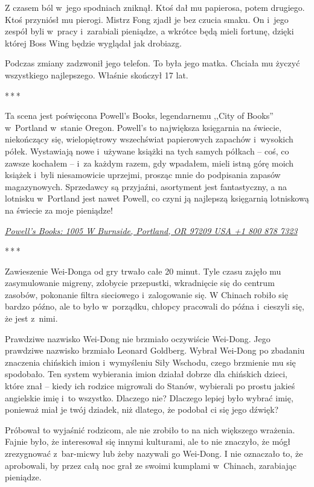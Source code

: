 \documentclass[oneside,polish,11pt,rmheadings]{mwbk}
\newcommand{\threeast}{\par\centerline{*\,*\,*}\medskip\par}
\begin{document}
Z czasem ból w~jego spodniach zniknął. Ktoś dał mu papierosa, potem drugiego. Ktoś przyniósł mu pierogi. Mistrz Fong zjadł je bez czucia smaku. On i~jego zespół byli w~pracy i~zarabiali pieniądze, a wkrótce będą mieli fortunę, dzięki której Boss Wing będzie wyglądał jak drobiazg. 


Podczas zmiany zadzwonił jego telefon. To była jego matka. Chciała mu życzyć wszystkiego najlepszego. Właśnie skończył 17 lat. 


\bigskip
\threeast


Ta scena jest poświęcona Powell's Books, legendarnemu ,,City of Books'' w~Portland w~stanie Oregon. Powell's to największa księgarnia na świecie, niekończący się, wielopiętrowy wszechświat papierowych zapachów i~wysokich półek. Wystawiają nowe i~używane książki na tych samych półkach -- coś, co zawsze kochałem -- i~za każdym razem, gdy wpadałem, mieli istną górę moich książek i~byli niesamowicie uprzejmi, prosząc mnie do podpisania zapasów magazynowych. Sprzedawcy są przyjaźni, asortyment jest fantastyczny, a na lotnisku w~Portland jest nawet Powell, co czyni ją najlepszą księgarnią lotniskową na świecie za moje pieniądze! 


\href{https://www.powells.com/SearchResults?keyword=Cory+Doctorow}{\textit{Powell's Books: 1005 W Burnside, Portland, OR 97209 USA +1 800 878 7323}} 

\bigskip
\threeast

Zawieszenie Wei-Donga od gry trwało całe 20 minut. Tyle czasu zajęło mu zasymulowanie migreny, zdobycie przepustki, wkradnięcie się do centrum zasobów, pokonanie filtra sieciowego i~zalogowanie się. W Chinach robiło się bardzo późno, ale to było w~porządku, chłopcy pracowali do późna i~cieszyli się, że jest z~nimi. 


Prawdziwe nazwisko Wei-Dong nie brzmiało oczywiście Wei-Dong. Jego prawdziwe nazwisko brzmiało Leonard Goldberg. Wybrał Wei-Dong po zbadaniu znaczenia chińskich imion i~wymyśleniu Siły Wschodu, czego brzmienie mu się spodobało. Ten system wybierania imion działał dobrze dla chińskich dzieci, które znał -- kiedy ich rodzice migrowali do Stanów, wybierali po prostu jakieś angielskie imię i~to wszystko. Dlaczego nie? Dlaczego lepiej było wybrać imię, ponieważ miał je twój dziadek, niż dlatego, że podobał ci się jego dźwięk? 


Próbował to wyjaśnić rodzicom, ale nie zrobiło to na nich większego wrażenia. Fajnie było, że interesował się innymi kulturami, ale to nie znaczyło, że mógł zrezygnować z~bar-micwy lub żeby nazywali go Wei-Dong. I nie oznaczało to, że aprobowali, by przez całą noc grał ze swoimi kumplami w~Chinach, zarabiając pieniądze. 
\end{document}
